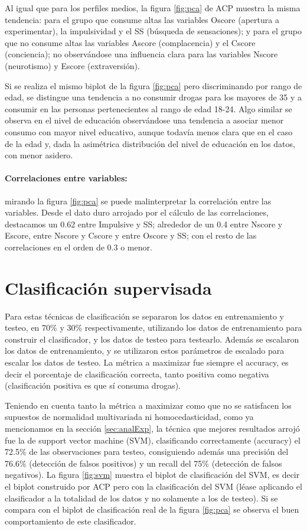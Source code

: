\documentclass[a4paper,twocolumn]{article}
\begin{document}
Al igual que para los perfiles medios, la figura \ref{fig:pca} de ACP muestra la misma tendencia: para el grupo que consume altas las variables Oscore (apertura a experimentar), la impulsividad y el SS (búsqueda de sensaciones); y para el grupo que no consume altas las variables Ascore (complacencia) y el Cscore (conciencia); no observándose una influencia clara para las variables Nscore (neurotismo) y Escore (extraversión).

Si se realiza el mismo biplot de la figura \ref{fig:pca} pero discriminando por rango de edad, se distingue una tendencia a no consumir drogas para los mayores de 35 y a consumir en las personas pertenecientes al rango de edad 18-24. Algo similar se observa en el nivel de educación observándose una tendencia a asociar menor consumo con mayor nivel educativo, aunque todavía menos clara que en el caso de la edad y, dada la asimétrica distribución del nivel de educación en los datos, con menor asidero.

\paragraph{Correlaciones entre variables:} mirando la figura \ref{fig:pca} se puede malinterpretar la correlación entre las variables. Desde el dato duro arrojado por el cálculo de las correlaciones, destacamos un 0.62 entre Impulsive y SS; alrededor de un 0.4 entre Nscore y Escore, entre Nscore y Cscore y entre Oscore y SS; con el resto de las correlaciones en el orden de 0.3 o menor.


\section{Clasificación supervisada}
Para estas técnicas de clasificación se separaron los datos en entrenamiento y testeo, en 70\% y 30\% respectivamente, utilizando los datos de entrenamiento para construir el clasificador, y los datos de testeo para testearlo. Además se escalaron los datos de entrenamiento, y se utilizaron estos parámetros de escalado para escalar los datos de testeo. La métrica a maximizar fue siempre el accuracy, es decir el porcentaje de clasificación correcta, tanto positiva como negativa (clasificación positiva es que sí consuma drogas).

Teniendo en cuenta tanto la métrica a maximizar como que no se satisfacen los supuestos de normalidad multivariada ni homocedasticidad, como ya mencionamos en la sección \ref*{sec:analExp}, la técnica que mejores resultados arrojó fue la de support vector machine (SVM), clasificando correctamente (accuracy) el 72.5\% de las observaciones para testeo, consiguiendo además una precisión del 76.6\% (detección de falsos positivos) y un recall del 75\% (detección de falsos negativos). La figura \ref{fig:svm} muestra el biplot de clasificación del SVM, es decir el biplot construido por ACP pero con la clasificación del SVM (léase aplicando el clasificador a la totalidad de los datos y no solamente a los de testeo). Si se compara con el biplot de clasificación real de la figura \ref{fig:pca} se observa el buen comportamiento de este clasificador.
\end{document}
